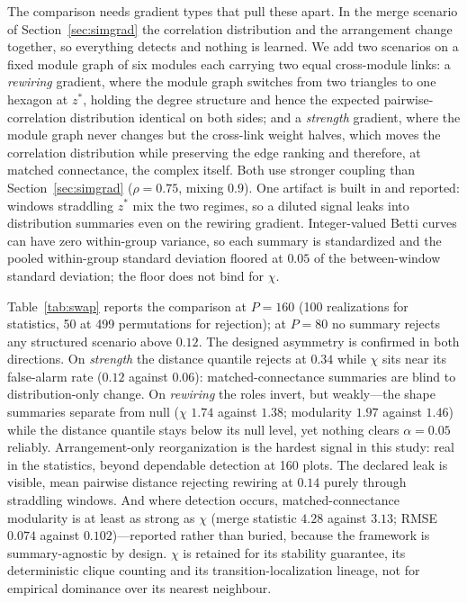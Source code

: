 \documentclass[review,12pt,authoryear]{elsarticle}
\theoremstyle{remark}
\begin{document}
The comparison needs gradient types that pull these apart. In the merge
scenario of Section~\ref{sec:simgrad} the correlation distribution and the
arrangement change together, so everything detects and nothing is learned.
We add two scenarios on a fixed module graph of six modules each carrying
two equal cross-module links: a \emph{rewiring} gradient, where the module
graph switches from two triangles to one hexagon at $z^\ast$, holding the
degree structure and hence the expected pairwise-correlation distribution
identical on both sides; and a \emph{strength} gradient, where the module
graph never changes but the cross-link weight halves, which moves the
correlation distribution while preserving the edge ranking and therefore,
at matched connectance, the complex itself. Both use stronger coupling than
Section~\ref{sec:simgrad} ($\rho = 0.75$, mixing $0.9$). One artifact is
built in and reported: windows straddling $z^\ast$ mix the two regimes, so a
diluted signal leaks into distribution summaries even on the rewiring
gradient. Integer-valued Betti curves can have zero within-group variance,
so each summary is standardized and the pooled within-group standard
deviation floored at $0.05$ of the between-window standard deviation; the
floor does not bind for $\chi$.

Table~\ref{tab:swap} reports the comparison at $P = 160$ (100 realizations
for statistics, 50 at 499 permutations for rejection); at $P = 80$ no
summary rejects any structured scenario above $0.12$. The designed asymmetry
is confirmed in both directions. On \emph{strength} the distance quantile
rejects at $0.34$ while $\chi$ sits near its false-alarm rate ($0.12$
against $0.06$): matched-connectance summaries are blind to
distribution-only change. On \emph{rewiring} the roles invert, but
weakly---the shape summaries separate from null ($\chi$ $1.74$ against
$1.38$; modularity $1.97$ against $1.46$) while the distance quantile stays
below its null level, yet nothing clears $\alpha = 0.05$ reliably.
Arrangement-only reorganization is the hardest signal in this study: real in
the statistics, beyond dependable detection at 160 plots. The declared leak
is visible, mean pairwise distance rejecting rewiring at $0.14$ purely
through straddling windows. And where detection occurs, matched-connectance
modularity is at least as strong as $\chi$ (merge statistic $4.28$ against
$3.13$; RMSE $0.074$ against $0.102$)---reported rather than buried, because
the framework is summary-agnostic by design. $\chi$ is retained for its
stability guarantee, its deterministic clique counting and its
transition-localization lineage, not for empirical dominance over its
nearest neighbour.
\end{document}
